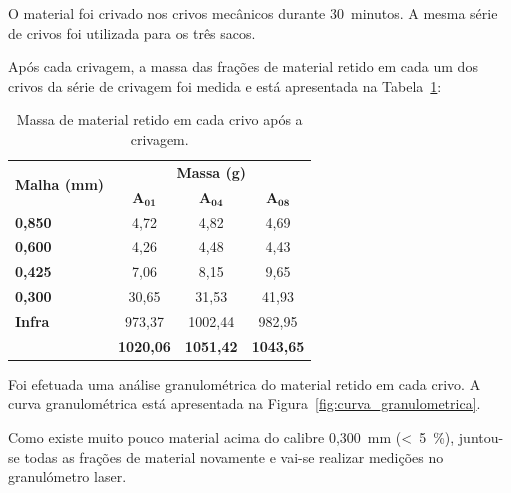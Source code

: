 O material foi crivado nos crivos mecânicos durante 30~minutos.
A mesma série de crivos foi utilizada para os três sacos.

Após cada crivagem, a massa das frações de material retido em cada um dos crivos da série de crivagem foi medida e está apresentada na Tabela~\ref{tab:massa_retido_crivagem}:

\begin{table}[!htb]
    \centering
    \begin{tabular}{@{}lccc@{}}
        \toprule
        \multirow{2}{*}{\textbf{Malha (mm)}} & \multicolumn{3}{c}{\textbf{Massa (g)}} \\ \cmidrule(lr){2-4}
         & \multicolumn{1}{c}{\textbf{A$\bm{_{01}}$}} & \multicolumn{1}{c}{\textbf{A$\bm{_{04}}$}} & \textbf{A$\bm{_{08}}$} \\ \hline
        \textbf{0,850} & \multicolumn{1}{c}{4,72} & \multicolumn{1}{c}{4,82} & 4,69 \\
        \textbf{0,600} & \multicolumn{1}{c}{4,26} & \multicolumn{1}{c}{4,48} & 4,43 \\
        \textbf{0,425} & \multicolumn{1}{c}{7,06} & \multicolumn{1}{c}{8,15} & 9,65 \\
        \textbf{0,300} & \multicolumn{1}{c}{30,65} & \multicolumn{1}{c}{31,53} & 41,93 \\
        \textbf{Infra} & \multicolumn{1}{c}{973,37} & \multicolumn{1}{c}{1002,44} & 982,95 \\ \midrule
        \textbf{\bm{$\sum$}}& \multicolumn{1}{c}{\textbf{1020,06}} & \multicolumn{1}{c}{\textbf{1051,42}} & \textbf{1043,65} \\ \bottomrule
    \end{tabular}
    \caption{Massa de material retido em cada crivo após a crivagem.}
    \label{tab:massa_retido_crivagem}
\end{table}

\newpara

Foi efetuada uma análise granulométrica do material retido em cada crivo.
A curva granulométrica está apresentada na Figura~\ref{fig:curva_granulometrica}.



Como existe muito pouco material acima do calibre 0,300~mm (<~5~\%), juntou-se todas as frações de material novamente e vai-se realizar medições no granulómetro laser.

